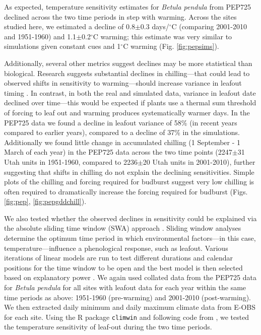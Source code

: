 \documentclass{article}
\begin{document}
\par As expected, temperature sensitivity estimates for \emph{Betula pendula} from PEP725 declined across the two time periods in step with warming. Across the sites studied here, we estimated a decline of 0.8$\pm$0.3 days/$^{\circ}$C (comparing 2001-2010 and 1951-1960) and 1.1$\pm$0.2$^{\circ}$C warming; this estimate was very similar to simulations given constant cues and 1$^{\circ}$C warming (Fig. \ref{fig:pepsims}). 

\par Additionally, several other metrics suggest declines may be more statistical than biological. Research suggests substantial declines in chilling---that could lead to observed shifts in sensitivity to warming---should increase variance in leafout timing \emph{\citep{ford2016}}. In contrast, in both the real and simulated data, variance in leafout date declined over time---this would be expected if plants use a thermal sum threshold of forcing to leaf out and warming produces systematically warmer days. In the PEP725 data we found a decline in leafout variance of 58\% (in recent years compared to earlier years), compared to a decline of 37\% in the simulations. Additionally we found little change in accumulated chilling (1 September - 1 March of each year) in the PEP725 data across the two time points (2247$\pm$31 Utah units in 1951-1960, compared to 2236$\pm$20 Utah units in 2001-2010), further suggesting that shifts in chilling do not explain the declining sensitivities. Simple plots of the chilling and forcing required for budburst suggest very low chilling is often required to dramatically increase the forcing required for budburst (Figs. \ref{fig:pep}, \ref{fig:pepgddchill}). 
\par We also tested whether the observed declines in sensitivity could be explained via the absolute sliding time window (SWA) approach \emph{\citep{simmonds2019}}. Sliding window analyses determine the optimum time period in which environmental factors---in this case, temperature---influence a phenological response, such as leafout. Various iterations of linear models are run to test different durations and calendar positions for the time window to be open and the best model is then selected based on explanatory power \emph{\citep{simmonds2019, Bailey2016}}.  We again used collated data from the PEP725 data \emph{\citep{Templ2018}} for \emph{Betula pendula} for all sites with leafout data for each year within the same time periods as above: 1951-1960 (pre-warming) and 2001-2010 (post-warming). We then extracted daily minimum and daily maximum climate data from E-OBS \emph{\citep{cornes2018}} for each site. Using the R package \texttt{climwin} \emph{\citep{Bailey2016,vandepol2016}} and following code from \emph{\citep{simmonds2019}}, we tested the temperature sensitivity of leaf-out during the two time periods.  
\end{document}
